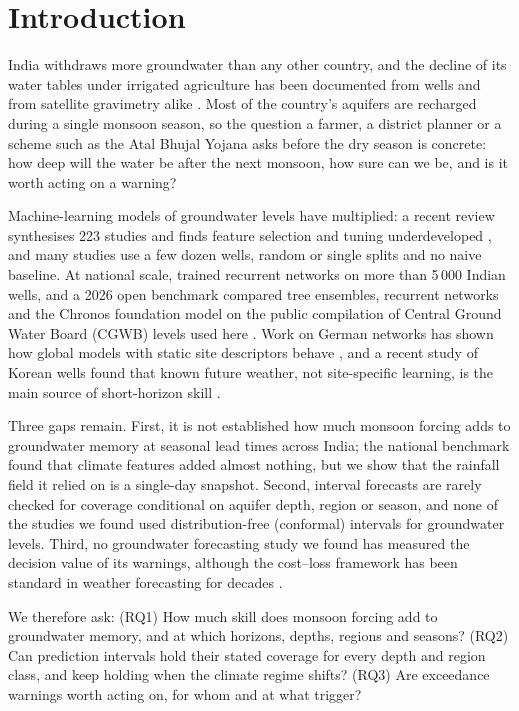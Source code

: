\documentclass[11pt,a4paper]{article}
\begin{document}
\section{Introduction}

India withdraws more groundwater than any other country, and the decline of its water tables under irrigated agriculture
has been documented from wells and from satellite gravimetry alike \citep{rodell2009india,asoka2017monsoon}. Most of the
country's aquifers are recharged during a single monsoon season, so the question a farmer, a district planner or a scheme
such as the Atal Bhujal Yojana asks before the dry season is concrete: how deep will the water be after the next monsoon,
how sure can we be, and is it worth acting on a warning?

Machine-learning models of groundwater levels have multiplied: a recent review synthesises 223 studies and finds feature
selection and tuning underdeveloped \citep{jesse2025review}, and many studies use a few dozen wells, random or single
splits and no naive baseline. At national scale,
\citet{malakar2021india} trained recurrent networks on more than 5\,000 Indian wells, and a 2026 open benchmark compared
tree ensembles, recurrent networks and the Chronos foundation model on the public compilation of Central Ground Water Board
(CGWB) levels used here \citep{alphoenixx2026benchmark}. Work on German networks has shown how global models with static
site descriptors behave \citep{heudorfer2024global,gomez2024cnn,ohmer2026gems}, and a recent study of Korean wells found
that known future weather, not site-specific learning, is the main source of short-horizon skill \citep{kim2026sources}.

Three gaps remain. First, it is not established how much monsoon forcing adds to groundwater memory at seasonal lead times
across India; the national benchmark found that climate features added almost nothing, but we show that the rainfall field
it relied on is a single-day snapshot. Second, interval forecasts are rarely checked for coverage conditional on aquifer
depth, region or season, and none of the studies we found used distribution-free (conformal) intervals for groundwater
levels. Third, no groundwater forecasting study we found has measured the decision value of its warnings, although the
cost--loss framework has been standard in weather forecasting for decades \citep{richardson2000value}.

We therefore ask: (RQ1) How much skill does monsoon forcing add to groundwater memory, and at which horizons, depths,
regions and seasons? (RQ2) Can prediction intervals hold their stated coverage for every depth and region class, and keep
holding when the climate regime shifts? (RQ3) Are exceedance warnings worth acting on, for whom and at what trigger?
\end{document}
